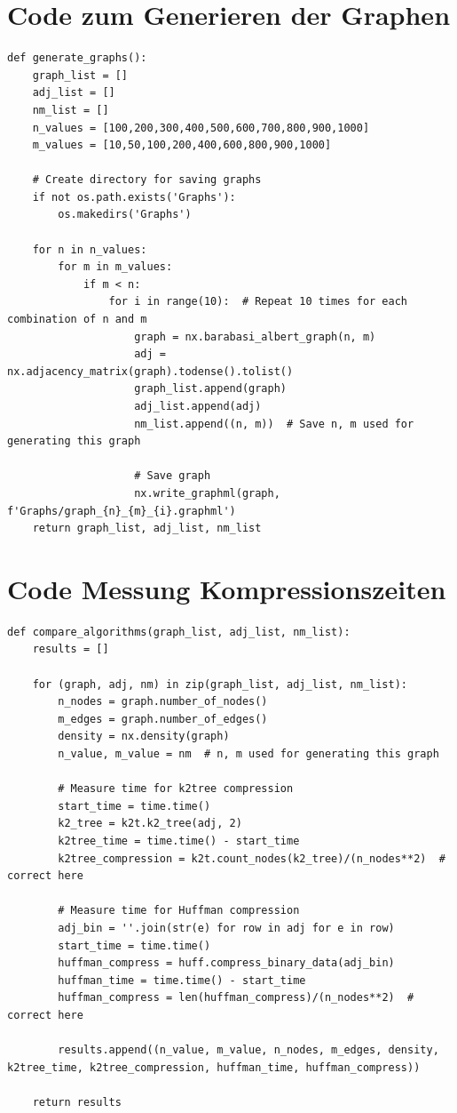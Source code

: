 \documentclass{ffhsthesis}
\begin{document}
\section{Code zum Generieren der Graphen}
\label{code:graphgen}
\begin{verbatim}
def generate_graphs():
    graph_list = []
    adj_list = []
    nm_list = []
    n_values = [100,200,300,400,500,600,700,800,900,1000]
    m_values = [10,50,100,200,400,600,800,900,1000]
    
    # Create directory for saving graphs
    if not os.path.exists('Graphs'):
        os.makedirs('Graphs')

    for n in n_values:
        for m in m_values:
            if m < n:
                for i in range(10):  # Repeat 10 times for each combination of n and m
                    graph = nx.barabasi_albert_graph(n, m)
                    adj = nx.adjacency_matrix(graph).todense().tolist()
                    graph_list.append(graph)
                    adj_list.append(adj)
                    nm_list.append((n, m))  # Save n, m used for generating this graph

                    # Save graph
                    nx.write_graphml(graph, f'Graphs/graph_{n}_{m}_{i}.graphml')
    return graph_list, adj_list, nm_list
\end{verbatim}

\section{Code Messung Kompressionszeiten}
\label{code:compression_time}
\begin{verbatim}
def compare_algorithms(graph_list, adj_list, nm_list):
    results = []
    
    for (graph, adj, nm) in zip(graph_list, adj_list, nm_list):
        n_nodes = graph.number_of_nodes()
        m_edges = graph.number_of_edges()
        density = nx.density(graph)
        n_value, m_value = nm  # n, m used for generating this graph
        
        # Measure time for k2tree compression
        start_time = time.time()
        k2_tree = k2t.k2_tree(adj, 2)
        k2tree_time = time.time() - start_time
        k2tree_compression = k2t.count_nodes(k2_tree)/(n_nodes**2)  # correct here

        # Measure time for Huffman compression
        adj_bin = ''.join(str(e) for row in adj for e in row)
        start_time = time.time()
        huffman_compress = huff.compress_binary_data(adj_bin)
        huffman_time = time.time() - start_time
        huffman_compress = len(huffman_compress)/(n_nodes**2)  # correct here

        results.append((n_value, m_value, n_nodes, m_edges, density, k2tree_time, k2tree_compression, huffman_time, huffman_compress))
    
    return results
\end{verbatim}
\end{document}
